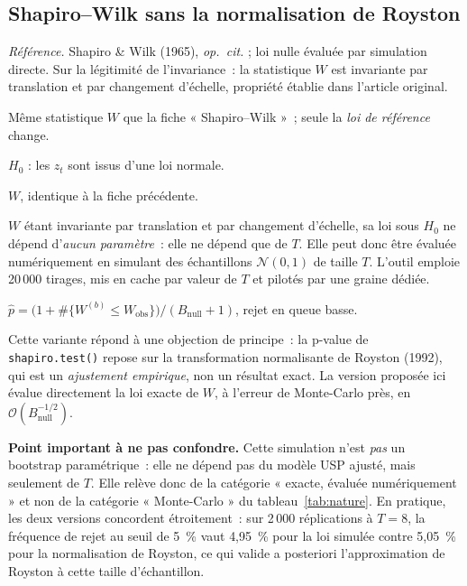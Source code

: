 \documentclass[a4paper,11pt]{article}
\newcommand{\code}[1]{\texttt{\small #1}}
\newcommand{\refl}[1]{{\small\textcolor{maincolor!70!black}{\textit{Référence.} #1}}\par\smallskip}
\newcounter{ficheid}
\newenvironment{fiche}[1]{%
  \stepcounter{ficheid}%
  \phantomsection
  \subsection{#1}%
  \label{fiche:\theficheid}%
}{%
  \end{description}\vspace{0.5em}%
}
\newcommand{\Cadre}{%
  \begin{description}[leftmargin=0pt, style=unboxed, itemsep=3pt, topsep=3pt, parsep=2pt]%
  \item[\textcolor{financeblue}{\textbf{1. Cadre, notations et hypothèses de validité (non testées).}}]}
\newcommand{\Hzero}{\item[\textcolor{financeblue}{\textbf{2. Hypothèse nulle.}}]}
\newcommand{\Stat}{\item[\textcolor{financeblue}{\textbf{3. Statistique de test.}}]}
\newcommand{\Loi}{\item[\textcolor{financeblue}{\textbf{4. Loi sous $H_0$.}}]}
\newcommand{\Pval}{\item[\textcolor{financeblue}{\textbf{5. p-value.}}]}
\newcommand{\Usage}{\item[\textcolor{financeblue}{\textbf{6. Usage et limites.}}]}
\begin{document}
\begin{fiche}{Shapiro--Wilk sans la normalisation de Royston}
\refl{Shapiro \& Wilk (1965), \emph{op.\ cit.} ; loi nulle évaluée par simulation directe.
Sur la légitimité de l'invariance~: la statistique $W$ est invariante par translation et par
changement d'échelle, propriété établie dans l'article original.}
\Cadre
Même statistique $W$ que la fiche « Shapiro--Wilk »~; seule la \emph{loi de référence} change.
\Hzero
$H_0$ : les $z_t$ sont issus d'une loi normale.
\Stat
$W$, identique à la fiche précédente.
\Loi
$W$ étant invariante par translation et par changement d'échelle, sa loi sous $H_0$ ne dépend
d'\emph{aucun paramètre}~: elle ne dépend que de $T$. Elle peut donc être évaluée numériquement
en simulant des échantillons $\mathcal{N}(0,1)$ de taille $T$. L'outil emploie
20\,000 tirages, mis en cache par valeur de $T$ et pilotés par une graine dédiée.
\Pval
$\hat p = \big(1 + \#\{W^{(b)} \le W_{\text{obs}}\}\big) / (B_{\text{null}} + 1)$, rejet en queue
basse.
\Usage
Cette variante répond à une objection de principe~: la p-value de \code{shapiro.test()} repose sur
la transformation normalisante de Royston (1992), qui est un \emph{ajustement empirique}, non un
résultat exact. La version proposée ici évalue directement la loi exacte de $W$, à l'erreur de
Monte-Carlo près, en $\mathcal{O}(B_{\text{null}}^{-1/2})$.

\medskip
\textbf{Point important à ne pas confondre.} Cette simulation n'est \emph{pas} un bootstrap
paramétrique~: elle ne dépend pas du modèle USP ajusté, mais seulement de $T$. Elle relève donc
de la catégorie « exacte, évaluée numériquement » et non de la catégorie « Monte-Carlo » du
tableau~\ref{tab:nature}. En pratique, les deux versions concordent étroitement~: sur 2\,000
réplications à $T = 8$, la fréquence de rejet au seuil de 5~\% vaut 4,95~\% pour la loi simulée
contre 5,05~\% pour la normalisation de Royston, ce qui valide a posteriori l'approximation de
Royston à cette taille d'échantillon.
\end{fiche}
\end{document}
